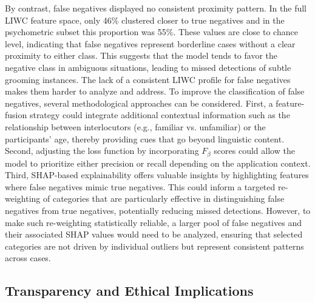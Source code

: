 By contrast, false negatives displayed no consistent proximity pattern. In the full LIWC feature space, only 46\% clustered closer to true negatives and in the psychometric subset this proportion was 55\%. These values are close to chance level, indicating that false negatives represent borderline cases without a clear proximity to either class. This suggests that the model tends to favor the negative class in ambiguous situations, leading to missed detections of subtle grooming instances. The lack of a consistent LIWC profile for false negatives makes them harder to analyze and address. To improve the classification of false negatives, several methodological approaches can be considered. First, a feature-fusion strategy could integrate additional contextual information such as the relationship between interlocutors (e.g., familiar vs. unfamiliar) or the participants’ age, thereby providing cues that go beyond linguistic content. Second, adjusting the loss function by incorporating $F_{\beta}$ scores could allow the model to prioritize either precision or recall depending on the application context. Third, SHAP-based explainability offers valuable insights by highlighting features where false negatives mimic true negatives. This could inform a targeted re-weighting of categories that are particularly effective in distinguishing false negatives from true negatives, potentially reducing missed detections.  However, to make such re-weighting statistically reliable, a larger pool of false negatives and their associated SHAP values would need to be analyzed, ensuring that selected categories are not driven by individual outliers but represent consistent patterns across cases.


\subsection{Transparency and Ethical Implications}

